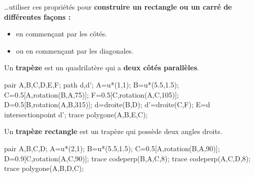 \begin{changemargin}{-5mm}{-15mm}
    \begin{remarque}

        \ldots utiliser ces propriétés pour \textbf{construire un rectangle ou un carré de différentes fa\c cons :}        
        \begin{itemize}
            \item en commen\c cant par les côtés.
            \item ou en commen\c cant par les diagonales.
        \end{itemize}
    \end{remarque}
    
    \begin{definition}        
        \begin{minipage}{0.7\linewidth}
            Un \textbf{trapèze} est un quadrilatère qui a \textbf{deux côtés parallèles}.
        \end{minipage}
        \hfill
        \begin{minipage}{0.3\linewidth}
            \begin{center}
                \begin{Geometrie}
                    pair A,B,C,D,E,F;
                    path d,d';
                    A=u*(1,1);
                    B=u*(5.5,1.5);
                    C=0.5[A,rotation(B,A,75)];
                    F=0.5[C,rotation(A,C,105)];
                    D=0.5[B,rotation(A,B,315)];
                    d=droite(B,D);
                    d'=droite(C,F);
                    E=d intersectionpoint d';
                    trace polygone(A,B,E,C);
                \end{Geometrie} 
            \end{center}
        \end{minipage}
    \end{definition}
  
    \begin{definition}        
        \begin{minipage}{0.7\linewidth}
            Un \textbf{trapèze rectangle} est un trapèze qui possède deux angles droits.
        \end{minipage}
        \hfill
        \begin{minipage}{0.3\linewidth}
            \begin{center}
                \begin{Geometrie}
                    pair A,B,C,D;
                    A=u*(2,1);
                    B=u*(5.5,1.5);
                    C=0.5[A,rotation(B,A,90)];
                    D=0.9[C,rotation(A,C,90)];
                    trace codeperp(B,A,C,8);
                    trace codeperp(A,C,D,8);
                    trace polygone(A,B,D,C);
                \end{Geometrie} 
            \end{center}
        \end{minipage}
    \end{definition}
\end{changemargin}
 
